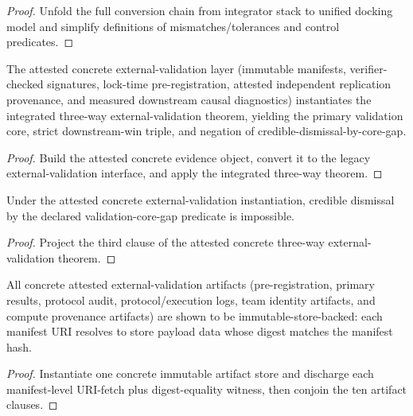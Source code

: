 \begin{proof}
Unfold the full conversion chain from integrator stack to unified docking model and simplify definitions of mismatches/tolerances and control predicates.
\end{proof}

\begin{theorem}\label{thm:attested-concrete-external-validation-threeway-bundle}
The attested concrete external-validation layer (immutable manifests, verifier-checked signatures, lock-time pre-registration, attested independent replication provenance, and measured downstream causal diagnostics) instantiates the integrated three-way external-validation theorem, yielding the primary validation core, strict downstream-win triple, and negation of credible-dismissal-by-core-gap.
\end{theorem}

\begin{proof}
Build the attested concrete evidence object, convert it to the legacy external-validation interface, and apply the integrated three-way theorem.
\end{proof}

\begin{theorem}\label{thm:attested-concrete-external-validation-not-credibly-dismissible}
Under the attested concrete external-validation instantiation, credible dismissal by the declared validation-core-gap predicate is impossible.
\end{theorem}

\begin{proof}
Project the third clause of the attested concrete three-way external-validation theorem.
\end{proof}

\begin{theorem}\label{thm:attested-concrete-store-backed-artifact-bundle}
All concrete attested external-validation artifacts (pre-registration, primary results, protocol audit, protocol/execution logs, team identity artifacts, and compute provenance artifacts) are shown to be immutable-store-backed: each manifest URI resolves to store payload data whose digest matches the manifest hash.
\end{theorem}

\begin{proof}
Instantiate one concrete immutable artifact store and discharge each manifest-level URI-fetch plus digest-equality witness, then conjoin the ten artifact clauses.
\end{proof}

